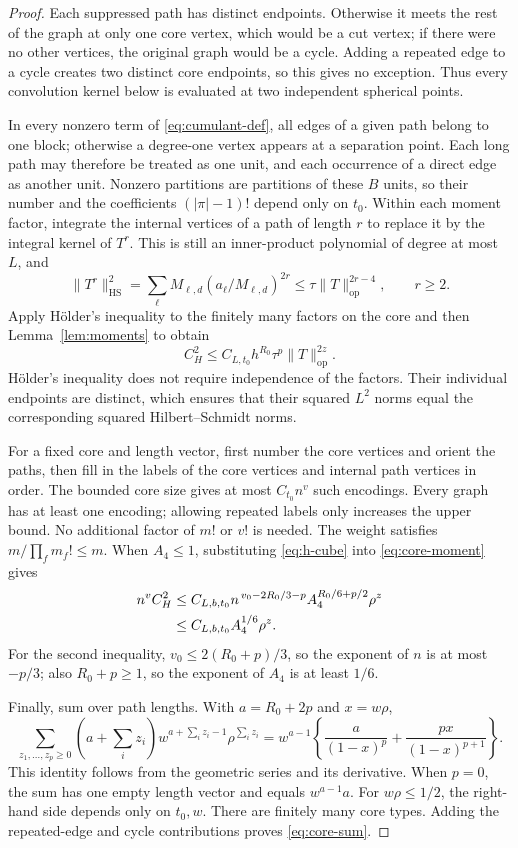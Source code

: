 \documentclass[11pt,reqno]{amsart}
\numberwithin{equation}{section}
\theoremstyle{definition}
\theoremstyle{remark}
\theoremstyle{definition}
\begin{document}
\begin{proof}
Each suppressed path has distinct endpoints. Otherwise it meets the rest of the graph at only one core vertex,
which would be a cut vertex; if there were no other vertices, the original graph would be a cycle.
Adding a repeated edge to a cycle creates two distinct core endpoints, so this gives no exception.
Thus every convolution kernel below is evaluated at two independent spherical points.

In every nonzero term of \eqref{eq:cumulant-def}, all edges of a given path belong to one block;
otherwise a degree-one vertex appears at a separation point. Each long path may therefore be treated as one unit,
and each occurrence of a direct edge as another unit.
Nonzero partitions are partitions of these $B$ units, so their number and the coefficients $(|\pi|-1)!$ depend only on $t_0$.
Within each moment factor, integrate the internal vertices of a path of length $r$ to replace it by the integral kernel of $T^r$.
This is still an inner-product polynomial of degree at most $L$, and
\[
 \|T^r\|_{\mathrm{HS}}^2
   =\sum_\ell M_{\ell,d}(a_\ell/M_{\ell,d})^{2r}
   \le \tau\|T\|_{\mathrm{op}}^{2r-4},\qquad r\ge2.
\]
Apply H\"older's inequality to the finitely many factors on the core and then Lemma~\ref{lem:moments}
to obtain
\begin{equation}\label{eq:core-moment}
 C_H^2\le C_{L,t_0}h^{R_0}\tau^p\|T\|_{\mathrm{op}}^{2z}.
\end{equation}
H\"older's inequality does not require independence of the factors. Their individual endpoints are distinct,
which ensures that their squared $L^2$ norms equal the corresponding squared Hilbert--Schmidt norms.

For a fixed core and length vector, first number the core vertices and orient the paths,
then fill in the labels of the core vertices and internal path vertices in order.
The bounded core size gives at most $C_{t_0}n^v$ such encodings.
Every graph has at least one encoding; allowing repeated labels only increases the upper bound.
No additional factor of $m!$ or $v!$ is needed.
The weight satisfies $m/\prod_fm_f!\le m$.
When $A_4\le1$, substituting \eqref{eq:h-cube} into \eqref{eq:core-moment} gives
\begin{align}
 n^vC_H^2
 &\le C_{L,b,t_0}
  n^{\,v_0-2R_0/3-p} A_4^{R_0/6+p/2}\rho^z\notag\\
 &\le C_{L,b,t_0}A_4^{1/6}\rho^z.\label{eq:core-small}
\end{align}
For the second inequality, $v_0\le2(R_0+p)/3$, so the exponent of $n$ is at most $-p/3$;
also $R_0+p\ge1$, so the exponent of $A_4$ is at least $1/6$.

Finally, sum over path lengths. With $a=R_0+2p$ and $x=w\rho$,
\[
 \sum_{z_1,\ldots,z_p\ge0}(a+\textstyle\sum_i z_i)
       w^{a+\sum_i z_i-1}\rho^{\sum_i z_i}
 =w^{a-1}\left\{\frac{a}{(1-x)^p}
             +\frac{px}{(1-x)^{p+1}}\right\}.
\]
This identity follows from the geometric series and its derivative. When $p=0$, the sum has one empty length vector and equals $w^{a-1}a$.
For $w\rho\le1/2$, the right-hand side depends only on $t_0,w$.
There are finitely many core types. Adding the repeated-edge and cycle contributions proves \eqref{eq:core-sum}.
\end{proof}
\end{document}
